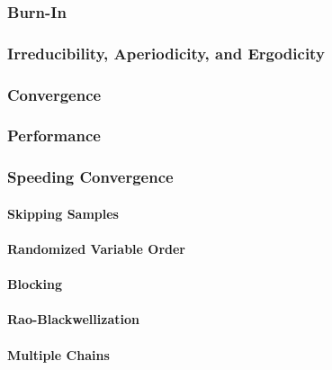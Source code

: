 			\subsubsection{Burn-In} %

			\subsubsection{Irreducibility, Aperiodicity, and Ergodicity} %

			\subsubsection{Convergence} %

			\subsubsection{Performance} %

			\subsubsection{Speeding Convergence} %

				\paragraph{Skipping Samples} %

				\paragraph{Randomized Variable Order} %

				\paragraph{Blocking} %

				\paragraph{Rao-Blackwellization} %

				\paragraph{Multiple Chains} %

